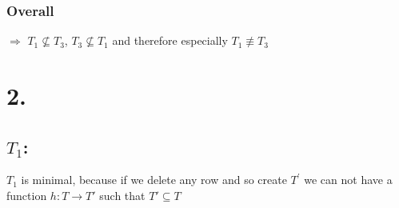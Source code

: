 \documentclass[12pt]{article}
\begin{document}
	\subsubsection*{Overall}
	$\Rightarrow$ $T_1\not\subseteq T_3$, $T_3 \not\subseteq T_1$ and therefore especially $T_1 \not\equiv T_3$ 
	
	\section*{2.}
	\subsection*{$T_1$:}
	$T_1$ is minimal, because if we delete any row and so create $T^\prime$ we can not have a function $h:T\rightarrow T'$ such that $T'\subseteq T$
	
\end{document}

